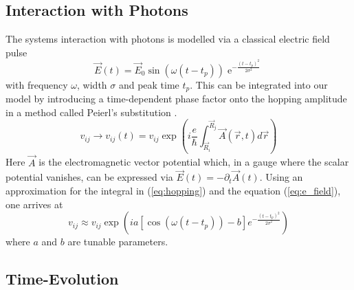 \subsection{Interaction with Photons}
The systems interaction with photons is modelled via a classical electric field pulse
\begin{equation}
    \Vec{E}(t) = \Vec{E}_0 \sin(\omega(t-t_p))\operatorname{e}^{-\frac{(t-t_p)^2}{2\sigma^2}} \label{eq:e_field}
\end{equation}
with frequency $\omega$, width $\sigma$ and peak time $t_p$. This can be integrated into our model by introducing a time-dependent phase factor onto the hopping amplitude in a method called Peierl's substitution \cite{peierl}.
\begin{equation}
    v_{ij} \to v_{ij}(t) = v_{ij}\exp\left(i\frac{e}{\hbar} \int_{\Vec{R}_i}^{\Vec{R}_j} \Vec{A}(\Vec{r},t) d\Vec{r}\right)\label{eq:hopping}
\end{equation}
Here $\Vec{A}$ is the electromagnetic vector potential which, in a gauge where the scalar potential vanishes, can be expressed via $\Vec{E}(t) = -\partial_t \Vec{A}(t)$. Using an approximation for the integral in (\ref{eq:hopping}) and the equation (\ref{eq:e_field}), one arrives at
\begin{equation}
    v_{ij} \approx v_{ij} \exp\left(ia[\cos(\omega (t-t_p))-b] e^{-\frac{(t-t_p)^2}{2\sigma^2}}\right)
\end{equation}
where $a$ and $b$ are tunable parameters.


\subsection{Time-Evolution}

